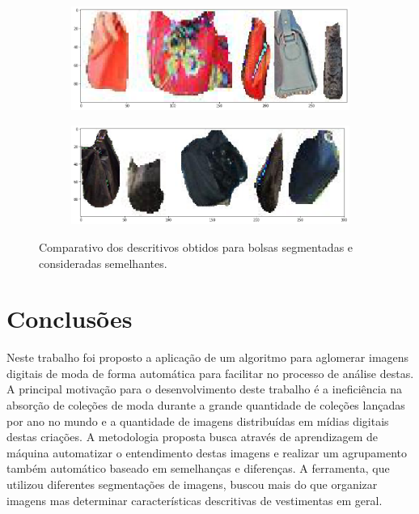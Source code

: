 \documentclass[12pt]{report}
\begin{document}
\begin{figure}
  \centering
  \begin{subfigure}[b]{\textwidth}
  \centering
    \includegraphics[scale=0.4]{images/resultados/compabolsa.png}
    \label{fig:}
  \end{subfigure}
  \centering
  \begin{subfigure}[b]{\textwidth}
  \centering
    \includegraphics[scale=0.4]{images/resultados/compabolsas2.png}
    \label{fig:}
  \end{subfigure}
  \caption{Comparativo dos descritivos obtidos para bolsas segmentadas e consideradas semelhantes.}
  \label{fig:compabolsa}
\end{figure}



\chapter{Conclusões}
\label{cha:conclusoes}

Neste trabalho foi proposto a aplicação de um algoritmo para aglomerar imagens digitais de moda de forma automática para facilitar no processo de análise destas. A principal motivação para o desenvolvimento deste trabalho é a ineficiência na absorção de coleções de moda durante a grande quantidade de coleções lançadas por ano no mundo e a quantidade de imagens distribuídas em mídias digitais destas criações. A metodologia proposta busca através de aprendizagem de máquina automatizar o entendimento destas imagens e realizar um agrupamento também automático baseado em semelhanças e diferenças. A ferramenta, que utilizou diferentes segmentações de imagens, buscou mais do que organizar imagens mas determinar características descritivas de vestimentas em geral.
\end{document}
